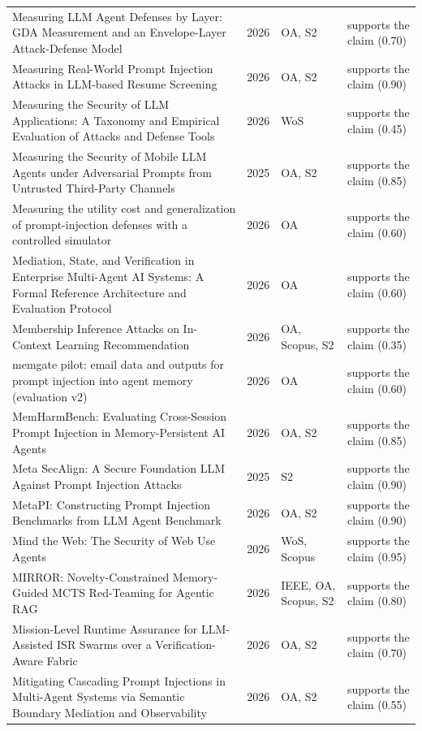 \begin{longtable}{@{}%
  >{\raggedright\arraybackslash}p{}c%
  >{\raggedright\arraybackslash}p{}%
  >{\raggedright\arraybackslash}p{}@{}}
Measuring LLM Agent Defenses by Layer: GDA Measurement and an Envelope-Layer Attack-Defense Model & 2026 & OA, S2 & supports the claim (0.70) \\
Measuring Real-World Prompt Injection Attacks in LLM-based Resume Screening & 2026 & OA, S2 & supports the claim (0.90) \\
Measuring the Security of LLM Applications: A Taxonomy and Empirical Evaluation of Attacks and Defense Tools & 2026 & WoS & supports the claim (0.45) \\
Measuring the Security of Mobile LLM Agents under Adversarial Prompts from Untrusted Third-Party Channels & 2025 & OA, S2 & supports the claim (0.85) \\
Measuring the utility cost and generalization of prompt-injection defenses with a controlled simulator & 2026 & OA & supports the claim (0.60) \\
Mediation, State, and Verification in Enterprise Multi-Agent AI Systems: A Formal Reference Architecture and Evaluation Protocol & 2026 & OA & supports the claim (0.60) \\
Membership Inference Attacks on In-Context Learning Recommendation & 2026 & OA, Scopus, S2 & supports the claim (0.35) \\
memgate pilot: email data and outputs for prompt injection into agent memory (evaluation v2) & 2026 & OA & supports the claim (0.60) \\
MemHarmBench: Evaluating Cross-Session Prompt Injection in Memory-Persistent AI Agents & 2026 & OA, S2 & supports the claim (0.85) \\
Meta SecAlign: A Secure Foundation LLM Against Prompt Injection Attacks & 2025 & S2 & supports the claim (0.90) \\
MetaPI: Constructing Prompt Injection Benchmarks from LLM Agent Benchmark & 2026 & OA, S2 & supports the claim (0.90) \\
Mind the Web: The Security of Web Use Agents & 2026 & WoS, Scopus & supports the claim (0.95) \\
MIRROR: Novelty-Constrained Memory-Guided MCTS Red-Teaming for Agentic RAG & 2026 & IEEE, OA, Scopus, S2 & supports the claim (0.80) \\
Mission-Level Runtime Assurance for LLM-Assisted ISR Swarms over a Verification-Aware Fabric & 2026 & OA, S2 & supports the claim (0.70) \\
Mitigating Cascading Prompt Injections in Multi-Agent Systems via Semantic Boundary Mediation and Observability & 2026 & OA, S2 & supports the claim (0.55) \\

\end{longtable}
